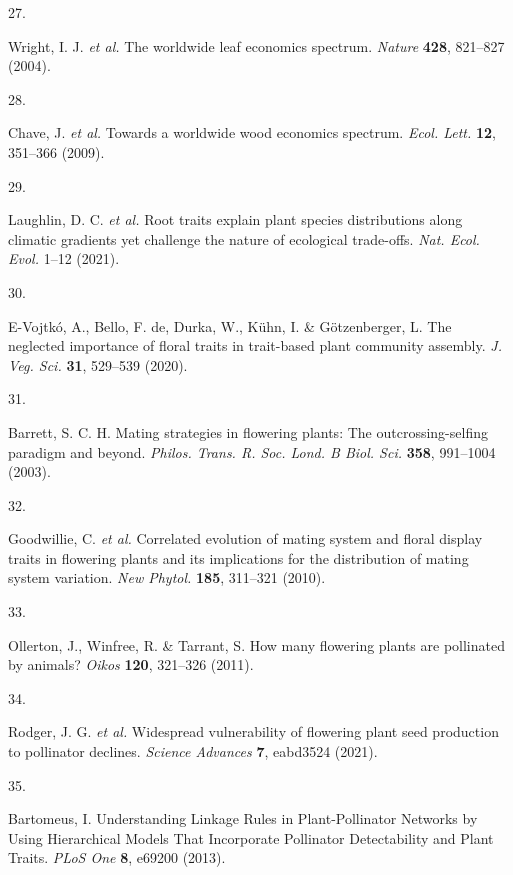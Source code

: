 \documentclass[
  12pt,
  a4paper,
]{article}
\newlength{\cslhangindent}
\newlength{\csllabelwidth}
\newlength{\cslentryspacingunit} %
\newenvironment{CSLReferences}[2] %
 {%
  \setlength{\parindent}{0pt}
  \ifodd #1
  \let\oldpar\par
  \def\par{\hangindent=\cslhangindent\oldpar}
  \fi
  \setlength{\parskip}{#2\cslentryspacingunit}
 }%
 {}
\newcommand{\CSLLeftMargin}[1]{\parbox[t]{\csllabelwidth}{#1}}
\newcommand{\CSLRightInline}[1]{\parbox[t]{\linewidth - \csllabelwidth}{#1}\break}
\begin{document}
\begin{CSLReferences}{0}{0}
\leavevmode{}%
\CSLLeftMargin{27. }
\CSLRightInline{Wright, I. J. \emph{et al.} The worldwide leaf economics spectrum. \emph{Nature} \textbf{428}, 821--827 (2004).}

\leavevmode{}%
\CSLLeftMargin{28. }
\CSLRightInline{Chave, J. \emph{et al.} Towards a worldwide wood economics spectrum. \emph{Ecol. Lett.} \textbf{12}, 351--366 (2009).}

\leavevmode{}%
\CSLLeftMargin{29. }
\CSLRightInline{Laughlin, D. C. \emph{et al.} Root traits explain plant species distributions along climatic gradients yet challenge the nature of ecological trade-offs. \emph{Nat. Ecol. Evol.} 1--12 (2021).}

\leavevmode{}%
\CSLLeftMargin{30. }
\CSLRightInline{E-Vojtkó, A., Bello, F. de, Durka, W., Kühn, I. \& Götzenberger, L. The neglected importance of floral traits in trait-based plant community assembly. \emph{J. Veg. Sci.} \textbf{31}, 529--539 (2020).}

\leavevmode{}%
\CSLLeftMargin{31. }
\CSLRightInline{Barrett, S. C. H. Mating strategies in flowering plants: The outcrossing-selfing paradigm and beyond. \emph{Philos. Trans. R. Soc. Lond. B Biol. Sci.} \textbf{358}, 991--1004 (2003).}

\leavevmode{}%
\CSLLeftMargin{32. }
\CSLRightInline{Goodwillie, C. \emph{et al.} Correlated evolution of mating system and floral display traits in flowering plants and its implications for the distribution of mating system variation. \emph{New Phytol.} \textbf{185}, 311--321 (2010).}

\leavevmode{}%
\CSLLeftMargin{33. }
\CSLRightInline{Ollerton, J., Winfree, R. \& Tarrant, S. How many flowering plants are pollinated by animals? \emph{Oikos} \textbf{120}, 321--326 (2011).}

\leavevmode{}%
\CSLLeftMargin{34. }
\CSLRightInline{Rodger, J. G. \emph{et al.} Widespread vulnerability of flowering plant seed production to pollinator declines. \emph{Science Advances} \textbf{7}, eabd3524 (2021).}

\leavevmode{}%
\CSLLeftMargin{35. }
\CSLRightInline{Bartomeus, I. Understanding {Linkage Rules} in {Plant}-{Pollinator Networks} by {Using Hierarchical Models That Incorporate Pollinator Detectability} and {Plant Traits}. \emph{PLoS One} \textbf{8}, e69200 (2013).}


\end{CSLReferences}
\end{document}
